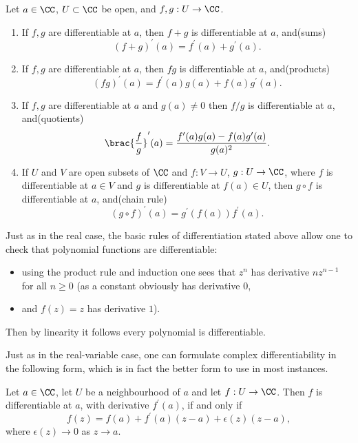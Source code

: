 \begin{lemma}
Let $a\in\CC$, $U\subset\CC$ be open, and $f,g:U\to\CC$.
\begin{enumerate}[label=(\roman*)]
\item If $f,g$ are differentiable at $a$, then $f+g$ is differentiable at $a$, and\hfill(sums)
\[(f+g)^\prime(a)=f^\prime(a)+g^\prime(a).\]
\item If $f,g$ are differentiable at $a$, then $fg$ is differentiable at $a$, and\hfill(products)
\[(fg)^\prime(a)=f^\prime(a)g(a)+f(a)g^\prime(a).\]
\item If $f,g$ are differentiable at $a$ and $g(a)\neq0$ then $f/g$ is differentiable at $a$, and\hfill(quotients)
\[\brac{\frac{f}{g}}^\prime(a)=\frac{f^\prime(a)g(a)-f(a)g^\prime(a)}{g(a)^2}.\]
\item If $U$ and $V$ are open subsets of $\CC$ and $f:V\to U$, $g:U\to\CC$, where $f$ is differentiable at $a\in V$ and $g$ is differentiable at $f(a)\in U$, then $g\circ f$ is differentiable at $a$, and\hfill(chain rule)
\[(g\circ f)^\prime(a)=g^\prime(f(a))f^\prime(a).\]
\end{enumerate}
\end{lemma}

\begin{example}[Polynomials]
Just as in the real case, the basic rules of differentiation stated above allow one to check that polynomial functions are differentiable:
\begin{itemize}
\item using the product rule and induction one sees that $z^n$ has derivative $nz^{n-1}$ for all $n\ge0$ (as a constant obviously has derivative $0$,
\item and $f(z)=z$ has derivative $1$).
\end{itemize}
Then by linearity it follows every polynomial is differentiable.
\end{example}

Just as in the real-variable case, one can formulate complex differentiability in the following form, which is in fact the better form to use in most instances.

\begin{lemma}
Let $a\in\CC$, let $U$ be a neighbourhood of $a$ and let $f:U\to\CC$. Then $f$ is differentiable at $a$, with derivative $f^\prime(a)$, if and only if
\[f(z)=f(a)+f^\prime(a)(z-a)+\epsilon(z)(z-a),\]
where $\epsilon(z)\to0$ as $z\to a$.
\end{lemma}

